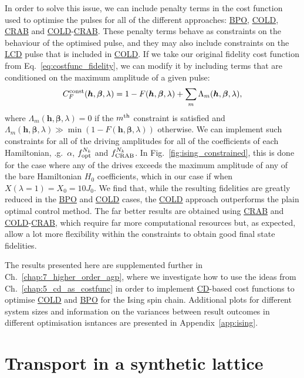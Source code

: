 \documentclass[a4paper,oneside,11pt]{book}
\newcommand{\betabb}{\boldsymbol{\beta}}
\newcommand{\hbb}{\boldsymbol{h}}
\newcommand{\acrref}[1]{\hyperref[acr:#1]{#1}}
\begin{document}
In order to solve this issue, we can include penalty terms in the cost function used to optimise the pulses for all of the different approaches: \acrref{BPO}, \acrref{COLD}, \acrref{CRAB} and \acrref{COLD}-\acrref{CRAB}. These penalty terms behave as constraints on the behaviour of the optimised pulse, and they may also include constraints on the \acrref{LCD} pulse that is included in \acrref{COLD}. If we take our original fidelity cost function from Eq.~\eqref{eq:costfunc_fidelity}, we can modify it by including terms that are conditioned on the maximum amplitude of a given pulse:
\begin{equation}
    C_F^{\rm const}(\hbb, \betabb, \lambda) = 1 - F(\hbb, \betabb, \lambda) + \sum_m \Lambda_m(\hbb, \betabb, \lambda),
\end{equation}
where $\Lambda_m(\hbb, \betabb, \lambda) = 0$ if the $m^{\rm th}$ constraint is satisfied and $\Lambda_m(\hbb, \betabb, \lambda) \gg \min(1 - F(\hbb, \betabb, \lambda))$ otherwise. We can implement such constraints for all of the driving amplitudes for all of the coefficients of each Hamiltonian, \@e.g.~$\alpha$, $f_{\rm opt}^{N_k}$ and $f_{\rm CRAB}^{N_k}$. In Fig.~\ref{fig:ising_constrained}, this is done for the case where any of the drives exceeds the maximum amplitude of any of the bare Hamiltonian $H_0$ coefficients, which in our case if when $X(\lambda = 1) = X_0 = 10J_0$. We find that, while the resulting fidelities are greatly reduced in the \acrref{BPO} and \acrref{COLD} cases, the \acrref{COLD} approach outperforms the plain optimal control method. The far better results are obtained using \acrref{CRAB} and \acrref{COLD}-\acrref{CRAB}, which require far more computational resources but, as expected, allow a lot more flexibility within the constraints to obtain good final state fidelities. 

The results presented here are supplemented further in Ch.~\ref{chap:7_higher_order_agp}, where we investigate how to use the ideas from Ch.~\ref{chap:5_cd_as_costfunc} in order to implement \acrref{CD}-based cost functions to optimise \acrref{COLD} and \acrref{BPO} for the Ising spin chain. Additional plots for different system sizes and information on the variances between result outcomes in different optimisation isntances are presented in Appendix~\ref{app:ising}.

\section{Transport in a synthetic lattice}\label{sec:5.3_synthetic}
\end{document}
